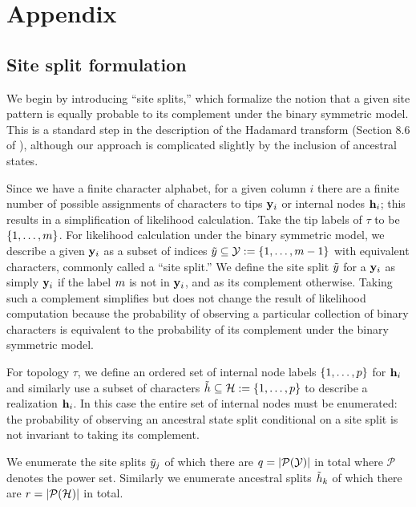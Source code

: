 \section*{Appendix}

\subsection*{Site split formulation}
We begin by introducing ``site splits,'' which formalize the notion that a given site pattern is equally probable to its complement under the binary symmetric model.
This is a standard step in the description of the Hadamard transform (Section 8.6 of \citet{Semple2003-em}), although our approach is complicated slightly by the inclusion of ancestral states.

Since we have a finite character alphabet, for a given column $i$ there are a finite number of possible assignments of characters to tips $\mathbf{y}_i$ or internal nodes $\mathbf{h}_i$; this results in a simplification of likelihood calculation.
Take the tip labels of $\tau$ to be $\{1,\ldots,m\}$.
For likelihood calculation under the binary symmetric model, we describe a given $\mathbf{y}_i$ as a subset of indices $\tilde{y}\subseteq\mathcal{Y}:=\{1,\ldots,m-1\}$ with equivalent characters, commonly called a ``site split.''
We define the site split $\tilde{y}$ for a $\mathbf{y}_i$ as simply $\mathbf{y}_i$ if the label $m$ is not in $\mathbf{y}_i$, and as its complement otherwise.
Taking such a complement simplifies but does not change the result of likelihood computation because the probability of observing a particular collection of binary characters is equivalent to the probability of its complement under the binary symmetric model.

For topology $\tau$, we define an ordered set of internal node labels $\{1,\ldots,p\}$ for $\mathbf{h}_i$ and similarly use a subset of characters $\tilde{h}\subseteq\mathcal{H}:=\{1,\ldots,p\}$ to describe a realization $\mathbf{h}_i$.
In this case the entire set of internal nodes must be enumerated: the probability of observing an ancestral state split conditional on a site split is not invariant to taking its complement.

We enumerate the site splits $\tilde{y}_j$ of which there are $q=|\mathcal{P}(\mathcal{Y})|$ in total where $\mathcal{P}$ denotes the power set.
Similarly we enumerate ancestral splits $\tilde{h}_k$ of which there are $r=|\mathcal{P}(\mathcal{H})|$ in total.

